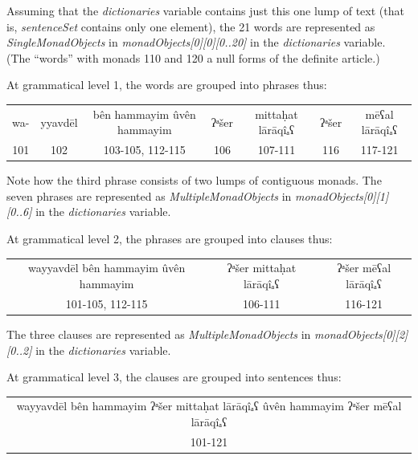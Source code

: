 \documentclass[11pt,oneside,a4paper]{memoir}
\begin{document}
Assuming that the \emph{dictionaries} variable contains just this one lump of text (that is,
\emph{sentenceSet} contains only one element), the 21 words are represented as
\emph{SingleMonadObjects} in \emph{monadObjects[0][0][0..20]} in the \emph{dictionaries} variable.
(The ``words'' with monads 110 and 120 a null forms of the definite article.)

At grammatical level 1, the words are grouped into phrases thus:

\begin{center}
\begin{shaded}
\begin{tabu}{@{}c|c|c|c|c|c|c@{}}
wa- & yyavdēl & bên hammayim ûvên hammayim & ʔᵃšer & mittaḥat lārāqîₐʕ & ʔᵃšer & mēʕal lārāqîₐʕ\\
101 & 102 & 103-105, 112-115 & 106 & 107-111 & 116 & 117-121\\
\end{tabu}
\end{shaded}
\end{center}

Note how the third phrase consists of two lumps of contiguous monads. The seven phrases are represented
as \emph{MultipleMonadObjects} in \emph{monadObjects[0][1][0..6]} in the \emph{dictionaries} variable.


At grammatical level 2, the phrases are grouped into clauses thus:\label{clause-example}

\begin{center}
\begin{shaded}
\begin{tabu}{@{}c|c|c@{}}
wayyavdēl bên hammayim ûvên hammayim & ʔᵃšer mittaḥat lārāqîₐʕ & ʔᵃšer mēʕal lārāqîₐʕ\\
101-105, 112-115 & 106-111 & 116-121\\
\end{tabu}
\end{shaded}
\end{center}

The three clauses are represented
as \emph{MultipleMonadObjects} in \emph{monadObjects[0][2][0..2]} in the \emph{dictionaries} variable.

At grammatical level 3, the clauses are grouped into sentences thus:

\begin{center}
\begin{shaded}
\begin{tabu}{@{}c@{}}
wayyavdēl bên hammayim ʔᵃšer mittaḥat lārāqîₐʕ ûvên hammayim ʔᵃšer mēʕal lārāqîₐʕ\\
101-121\\
\end{tabu}
\end{shaded}
\end{center}
\end{document}
